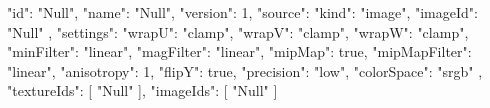 {
  "id": "Null",
  "name": "Null",
  "version": 1,
  "source": {
    "kind": "image",
    "imageId": "Null"
  },
  "settings": {
    "wrapU": "clamp",
    "wrapV": "clamp",
    "wrapW": "clamp",
    "minFilter": "linear",
    "magFilter": "linear",
    "mipMap": true,
    "mipMapFilter": "linear",
    "anisotropy": 1,
    "flipY": true,
    "precision": "low",
    "colorSpace": "srgb"
  },
  "textureIds": [
    "Null"
  ],
  "imageIds": [
    "Null"
  ]
}
